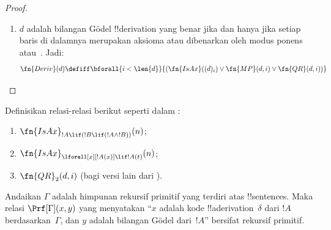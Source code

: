 \documentclass[../../../include/open-logic-section]{subfiles}
\begin{document}
\begin{proof}
\begin{enumerate}
  Versi lain dari \QR{} kita tinggalkan sebagai latihan.
\item $d$ adalah bilangan G\"odel !!{derivation} yang benar jika dan hanya
  jika setiap baris di dalamnya merupakan aksioma atau dibenarkan oleh modus
  ponens atau~\QR. Jadi:
  \[
  \fn{Deriv}(d) \defiff \bforall{i < \len{d}}{(\fn{IsAx}((d)_i) \lor
    \fn{MP}(d,i) \lor \fn{QR}(d, i))}
  \]
\end{enumerate}
\end{proof}

\begin{prob}
Definisikan relasi-relasi berikut seperti dalam
:
\begin{enumerate}
\item $\fn{IsAx}_{!A \lif (!B \lif (!A \land !B))}(n)$;
\item $\fn{IsAx}_{\lforall[x][!A(x)] \lif !A(t)}(n)$;
\item $\fn{QR}_{2}(d, i)$ (bagi versi lain dari \QR).
\end{enumerate}
\end{prob}

\begin{prop}
Andaikan $\Gamma$ adalah himpunan rekursif primitif yang terdiri atas
!!{sentence}s. Maka relasi $\Prf[\Gamma](x, y)$ yang menyatakan ``$x$ adalah
kode !!a{derivation}~$\delta$ dari $!A$ berdasarkan~$\Gamma$, dan $y$ adalah
bilangan G\"odel dari~$!A$'' bersifat rekursif primitif.
\end{prop}
\end{document}

